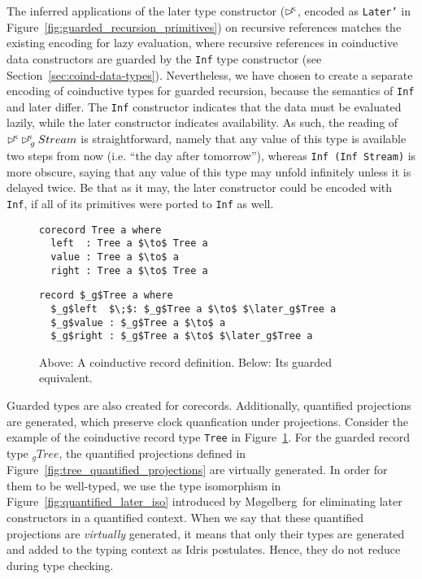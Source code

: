 The inferred applications of the later type constructor ($\rhd^{\!\!\kappa}$, encoded
as \texttt{Later'} in Figure~\ref{fig:guarded_recursion_primitives}) on
recursive references matches the existing encoding for lazy evaluation, where
recursive references in coinductive data constructors are guarded by the
\texttt{Inf} type constructor (see
Section~\ref{sec:coind-data-types}). Nevertheless, we have chosen to create a
separate encoding of coinductive types for guarded recursion, because the
semantics of \texttt{Inf} and later differ. The \texttt{Inf} constructor
indicates that the data must be evaluated lazily, while the later constructor
indicates availability. As such, the reading of
$\rhd^{\!\!\kappa}\rhd^{\!\!\kappa} _{g}Stream$ is straightforward, namely that any value of
this type is available two steps from now (i.e. ``the day after tomorrow''),
whereas \texttt{Inf (Inf Stream)} is more obscure, saying that any value of this
type may unfold infinitely unless it is delayed twice. Be that as it may, the
later constructor could be encoded with \texttt{Inf}, if all of its primitives
were ported to \texttt{Inf} as well.

\begin{figure}[h]
\begin{lstlisting}[mathescape]
corecord Tree a where
  left  : Tree a $\to$ Tree a
  value : Tree a $\to$ a
  right : Tree a $\to$ Tree a
\end{lstlisting}
\begin{lstlisting}[mathescape]
record $_g$Tree a where
  $_g$left  $\;$: $_g$Tree a $\to$ $\later_g$Tree a
  $_g$value : $_g$Tree a $\to$ a
  $_g$right : $_g$Tree a $\to$ $\later_g$Tree a
\end{lstlisting}
  \caption{Above: A coinductive record definition. Below: Its guarded equivalent.}
  \label{fig:guarded_tree_inf}
\end{figure}

Guarded types are also created for corecords. Additionally, quantified
projections are generated, which preserve clock quanfication under
projections. Consider the example of the coinductive record type \texttt{Tree}
in Figure~\ref{fig:guarded_tree_inf}. For the guarded record type $_{g}Tree$, the
quantified projections defined in Figure~\ref{fig:tree_quantified_projections}
are virtually generated. In order for them to be well-typed, we use the type
isomorphism in Figure~\ref{fig:quantified_later_iso} introduced by
Møgelberg\,\citep{Mogelberg:2014} for eliminating later constructors in a
quantified context. When we say that these quantified projections are
\emph{virtually} generated, it means that only their types are generated and
added to the typing context as Idris postulates. Hence, they do not reduce
during type checking. 

